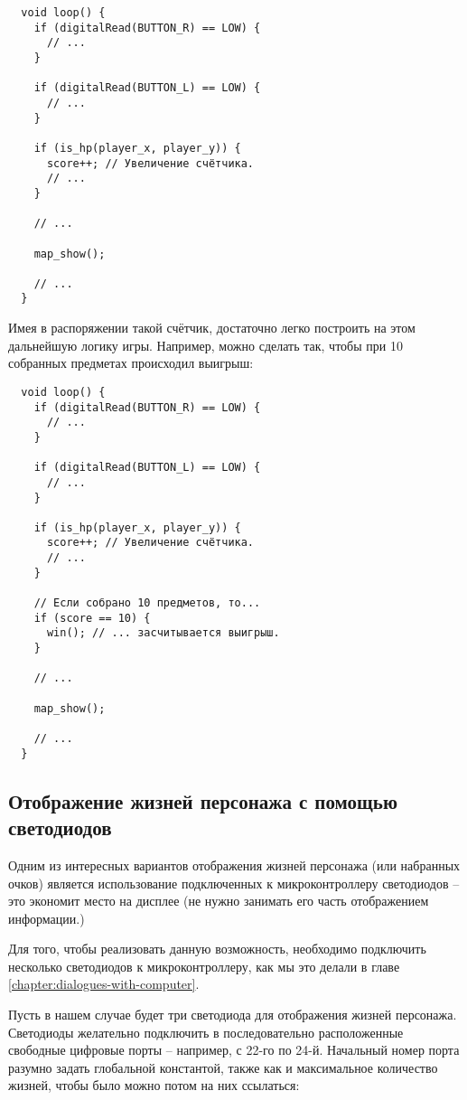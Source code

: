 \documentclass[../sparc.tex]{subfiles}
\begin{document}
\begin{verbatim}
  void loop() {
    if (digitalRead(BUTTON_R) == LOW) {
      // ...
    }

    if (digitalRead(BUTTON_L) == LOW) {
      // ...
    }

    if (is_hp(player_x, player_y)) {
      score++; // Увеличение счётчика.
      // ...
    }

    // ...

    map_show();

    // ...
  }
\end{verbatim}

Имея в распоряжении такой счётчик, достаточно легко построить на этом дальнейшую
логику игры.  Например, можно сделать так, чтобы при 10 собранных предметах
происходил выигрыш:

\begin{verbatim}
  void loop() {
    if (digitalRead(BUTTON_R) == LOW) {
      // ...
    }

    if (digitalRead(BUTTON_L) == LOW) {
      // ...
    }

    if (is_hp(player_x, player_y)) {
      score++; // Увеличение счётчика.
      // ...
    }

    // Если собрано 10 предметов, то...
    if (score == 10) {
      win(); // ... засчитывается выигрыш.
    }

    // ...

    map_show();

    // ...
  }
\end{verbatim}

\subsection{Отображение жизней персонажа с помощью светодиодов}

Одним из интересных вариантов отображения жизней персонажа (или набранных очков)
является использование подключенных к микроконтроллеру светодиодов -- это
экономит место на дисплее (не нужно занимать его часть отображением информации.)

Для того, чтобы реализовать данную возможность, необходимо подключить несколько
светодиодов к микроконтроллеру, как мы это делали в главе
\ref{chapter:dialogues-with-computer}.

Пусть в нашем случае будет три светодиода для отображения жизней персонажа.
Светодиоды желательно подключить в последовательно расположенные свободные
цифровые порты -- например, с 22-го по 24-й.  Начальный номер порта разумно
задать глобальной константой, также как и максимальное количество жизней, чтобы
было можно потом на них ссылаться:
\end{document}
